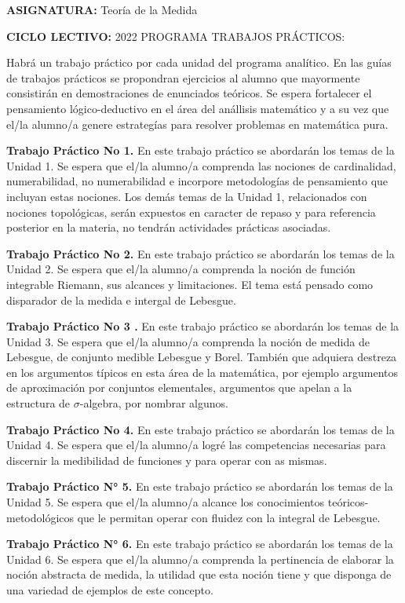 \documentclass[a4paper, 12pt]{article}
\begin{document}
 \textbf{ASIGNATURA:} Teoría de la Medida

 \textbf{CICLO LECTIVO:} 2022
 PROGRAMA TRABAJOS PRÁCTICOS:

 
Habrá un trabajo práctico por cada unidad del programa analítico. En las guías de trabajos prácticos se propondran ejercicios al alumno que mayormente consistirán en demostraciones de enunciados teóricos. Se espera fortalecer el pensamiento lógico-deductivo en el área del anállisis matemático y a su vez que el/la alumno/a genere estrategías para resolver problemas en matemática pura.

\noindent\textbf{Trabajo Práctico No 1.} En este trabajo práctico se abordarán los temas de la Unidad 1. Se espera que el/la alumno/a comprenda las nociones de cardinalidad, numerabilidad, no numerabilidad e incorpore metodologías de pensamiento que incluyan estas nociones. Los demás temas de la Unidad 1, relacionados con nociones topológicas, serán expuestos en caracter de repaso y para referencia posterior en la materia, no tendrán actividades prácticas asociadas.

\noindent\textbf{Trabajo Práctico No 2.} En este trabajo práctico se abordarán los temas de la Unidad 2. Se espera que el/la alumno/a comprenda la noción de función integrable Riemann, sus alcances y limitaciones. El tema está pensado como disparador de la medida e intergal de Lebesgue.

\noindent\textbf{Trabajo Práctico No 3 .} En este trabajo práctico se abordarán los temas de la Unidad 3. Se espera que el/la alumno/a comprenda la noción de medida de Lebesgue, de conjunto medible Lebesgue y Borel. También que adquiera destreza en los argumentos típicos en esta área de la matemática, por ejemplo argumentos de aproximación por conjuntos elementales, argumentos que apelan a la estructura de $\sigma$-algebra, por nombrar algunos.

\noindent\textbf{Trabajo Práctico No 4.} En este trabajo práctico se abordarán los temas de la Unidad 4. Se espera que el/la alumno/a logré las competencias necesarias para discernir la medibilidad de funciones y para operar con as mismas.

\noindent\textbf{Trabajo Práctico N° 5.} En este trabajo práctico se abordarán los temas de la Unidad 5. Se espera que el/la alumno/a alcance los conocimientos teóricos-metodológicos que le permitan operar con fluidez con la integral de Lebesgue.

\noindent\textbf{Trabajo Práctico N° 6.} En este trabajo práctico se abordarán los temas de la Unidad 6. Se espera que el/la alumno/a comprenda la pertinencia de elaborar la noción abstracta de medida, la utilidad que esta noción tiene y que disponga de una variedad de ejemplos de este concepto.
\end{document}
